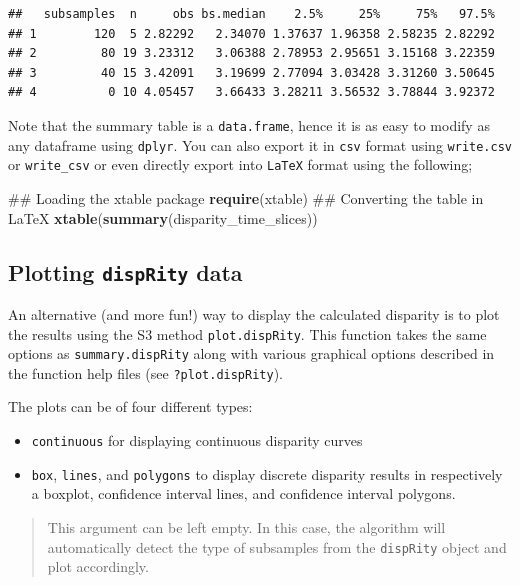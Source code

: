 \documentclass[]{book}
\newenvironment{Shaded}{\begin{snugshade}}{\end{snugshade}}
\newcommand{\KeywordTok}[1]{\textcolor[rgb]{0.13,0.29,0.53}{\textbf{#1}}}
\newcommand{\NormalTok}[1]{#1}
\providecommand{\tightlist}{%
  \setlength{\itemsep}{0pt}\setlength{\parskip}{0pt}}
\theoremstyle{definition}
\theoremstyle{definition}
\theoremstyle{remark}
\begin{document}
\begin{verbatim}
##   subsamples  n     obs bs.median    2.5%     25%     75%   97.5%
## 1        120  5 2.82292   2.34070 1.37637 1.96358 2.58235 2.82292
## 2         80 19 3.23312   3.06388 2.78953 2.95651 3.15168 3.22359
## 3         40 15 3.42091   3.19699 2.77094 3.03428 3.31260 3.50645
## 4          0 10 4.05457   3.66433 3.28211 3.56532 3.78844 3.92372
\end{verbatim}

Note that the summary table is a \texttt{data.frame}, hence it is as
easy to modify as any dataframe using \texttt{dplyr}. You can also
export it in \texttt{csv} format using \texttt{write.csv} or
\texttt{write\_csv} or even directly export into \texttt{LaTeX} format
using the following;

\begin{Shaded}
\begin{Highlighting}[]
\NormalTok{## Loading the xtable package}
\KeywordTok{require}\NormalTok{(xtable)}
\NormalTok{## Converting the table in LaTeX}
\KeywordTok{xtable}\NormalTok{(}\KeywordTok{summary}\NormalTok{(disparity_time_slices))}
\end{Highlighting}
\end{Shaded}

\subsection{\texorpdfstring{Plotting \texttt{dispRity}
data}{Plotting dispRity data}}\label{plotting-disprity-data}

An alternative (and more fun!) way to display the calculated disparity
is to plot the results using the S3 method \texttt{plot.dispRity}. This
function takes the same options as \texttt{summary.dispRity} along with
various graphical options described in the function help files (see
\texttt{?plot.dispRity}).

The plots can be of four different types:

\begin{itemize}
\tightlist
\item
  \texttt{continuous} for displaying continuous disparity curves
\item
  \texttt{box}, \texttt{lines}, and \texttt{polygons} to display
  discrete disparity results in respectively a boxplot, confidence
  interval lines, and confidence interval polygons.
\end{itemize}

\begin{quote}
This argument can be left empty. In this case, the algorithm will
automatically detect the type of subsamples from the \texttt{dispRity}
object and plot accordingly.
\end{quote}
\end{document}
